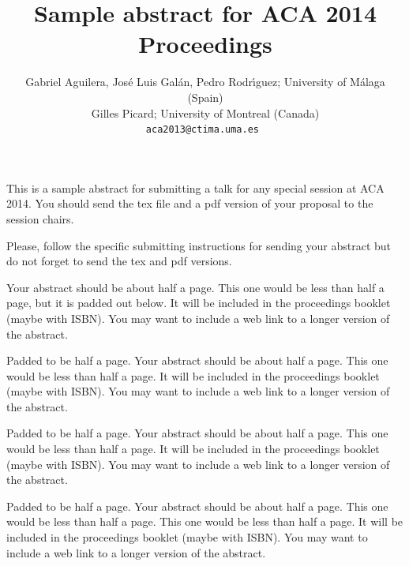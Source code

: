 \documentclass[titlepage=false]{article} %
\date{}
\newcommand{\inlinemaketitle}{{\let\newpage\relax\maketitle}}
\def\authors#1{\author{#1}} %
\begin{document}
\begingroup\let\clearpage\relax

\title{Sample  abstract for ACA 2014 Proceedings \vspace*{-8mm}}



\authors{Gabriel Aguilera, Jos\'e Luis Gal\'an, Pedro Rodr\'{\i}guez;  %
       University of M\'alaga (Spain)  \vspace*{1mm} \\ %
       \vspace*{1mm} 
       Gilles Picard;   University of Montreal (Canada)  \\ %
       \tt{aca2013@ctima.uma.es} %
       }%

\inlinemaketitle

\thispagestyle{empty}

\vspace*{-9mm}

This is a sample abstract for submitting a talk  for any special session at ACA 2014. You
should send the tex file and a pdf version of your proposal to the session chairs.

Please, follow the specific submitting instructions for sending your abstract but do not forget to
send the tex and pdf versions.

Your abstract should be about half a page.  This one would be less than half a page, but it is padded out below. It will be  included in the proceedings
booklet (maybe with ISBN).  You may want to include a web link to a longer version of the abstract.

Padded to be half a page. Your abstract should be about half a page.  This one would be less than half a page. It will be  included in the proceedings
booklet (maybe with ISBN).  You may want to include a web link to a longer version of the abstract.

Padded to be half a page.  Your abstract should be about half a page.  This one would be less than half a page. It will be  included in the proceedings
booklet (maybe with ISBN).  You may want to include a web link to a longer version of the abstract.

Padded to be half a page.  Your abstract should be about half a page.  This one would be less than half a page. This one would be less than half a page. It will be  included in the proceedings
booklet (maybe with ISBN).  You may want to include a web link to a longer version of the abstract.
\end{document}
